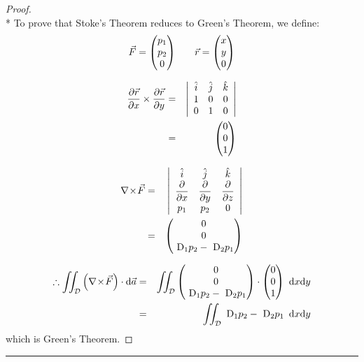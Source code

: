 \documentclass[10pt,a4paper]{report}
\theoremstyle{definition}
\theoremstyle{plain}
\theoremstyle{definition}
\theoremstyle{plain}
\newcommand{\dd}{\mathop{}\,\mathrm{d}}
\newcommand{\DD}{\mathop{}\,\mathrm{D}}
\newcommand{\ddns}{\mathrm{d}}
\newcommand{\parderiv}[2]{\dfrac{\partial #1}{\partial #2}}
\newenvironment{colvectorenvironment}{\left(\!\!\!\begin{array}{c}}{\end{array}\!\!\!\right)}
\newenvironment{proofenv}{\begin{proof}}{\end{proof}{\par\centering\rule{3cm}{.1pt}\par}}
\newcommand{\domain}{\mathcal{D}}
\newcommand{\curl}[1]{\nabla\!\times\!#1}
\newcommand{\colvector}[1]{\begin{colvectorenvironment}#1\end{colvectorenvironment}}
\begin{document}
\begin{proofenv}\ \\*
    To prove that Stoke's Theorem reduces to Green's Theorem, we define:
    \[
        \vec{F} = \begin{colvectorenvironment}p_1\\p_2\\0\end{colvectorenvironment}
        \qquad
        \vec{r} = \begin{colvectorenvironment}x\\y\\0\end{colvectorenvironment}
    \]
    
    \begin{eqnarray*}
        \parderiv{\vec{r}}{x} \times \parderiv{\vec{r}}{y} &=&
            \left|\begin{array}{ccc}
                \hat{i} &   \hat{j} &   \hat{k} \\
                1       &   0       &   0       \\
                0       &   1       &   0
            \end{array}\right| \\
        &=& \colvector{0\\0\\1}
    \end{eqnarray*}
    
    \begin{eqnarray*}
        \curl{\vec{F}} &=&
            \left|\begin{array}{ccc}
                \hat{i}         &   \hat{j}         &   \hat{k}         \\
                \parderiv{}{x}  &   \parderiv{}{y}  &   \parderiv{}{z}  \\
                p_1             &   p_2             &   0
            \end{array}\right| \\
        &=& \colvector{0\\0\\\DD_1p_2 - \DD_2p_1}
    \end{eqnarray*}
    
    \begin{eqnarray*}
        \therefore \iint_\domain \left( \curl{\vec{F}} \right) \cdot \ddns\vec{a}
        &=& \iint_\domain \colvector{0\\0\\\DD_1p_2 - \DD_2p_1} \cdot \colvector{0\\0\\1} \dd x\ddns y\\
        &=& \iint_\domain \DD_1p_2-\DD_2p_1\dd x\ddns y
    \end{eqnarray*}
    which is Green's Theorem.
\end{proofenv}
\end{document}
